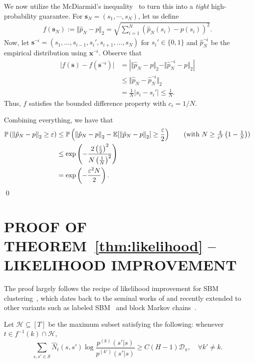 \documentclass[twoside]{article}
\def\vs{{\bm{s}}}
\def\vx{{\bm{x}}}
\def\gD{{\mathcal{D}}}
\def\gH{{\mathcal{H}}}
\def\gS{{\mathcal{S}}}
\def\sP{{\mathbb{P}}}
\newcommand{\E}{\mathbb{E}}
\theoremstyle{plain}
\def\bignorm#1{\left\lVert #1 \right\rVert}
\begin{document}
We now utilize the McDiarmid's inequality~\citep{mcdiarmid} to turn this into a \textit{tight} high-probability guarantee.
For $\vs_N = (s_1, \cdots, s_N)$, let us define
\begin{align*}
	f(\vs_N) := \Vert \hat{p}_N - p \Vert_2 = \sqrt{\sum_{i=1}^N (\hat{p}_N(s_i) - p(s_i))^2}.
\end{align*}
Now, let $\vs^{\neg i} = (s_1, \dots, s_{i-1}, s_i', s_{i+1}, \dots, s_N)$ for $s_i' \in \{0, 1\}$ and $\hat{p}_N^{\neg i}$ be the empirical distribution using $\vx^{\neg i}$.
Observe that 
\begin{align*}
	\vert f(\vs) - f(\vs^{\neg i}) \vert &= \left\vert  \Vert \hat{p}_N - p \Vert_2 - \Vert \hat{p}_N^{\neg i} - p \Vert_2 \right\vert \\
	&\le 
	\Vert \hat{p}_N - \hat{p}_N^{\neg i}  \Vert_2  \tag{Triangle inequality}   \\
	&= \frac{1}{N} |s_i - s_i'|
	\leq \frac{1}{N}.
\end{align*}
Thus, $f$ satisfies the bounded difference property with $c_i = 1 / N$.

Combining everything, we have that
\begin{align*}
	\sP\left( \bignorm{\hat{p}_N - p}_2 \geq \varepsilon \right) &\leq \sP\left( \bignorm{\hat{p}_N - p}_2 - \E[\bignorm{\hat{p}_N - p}_2] \geq \frac{\varepsilon}{2} \right) \tag{with $N \geq \frac{4}{\varepsilon^2}\left(1 - \frac{1}{S} \right)$} \\
	&\leq \exp\left( - \frac{2 \left(\frac{ \varepsilon}{2} \right)^2}{N \left(\frac{1}{N} \right)^2} \right) \\
	&= \exp\left( - \frac{\varepsilon^2 N}{2} \right).
\end{align*}
\qed


\clearpage

\section{\texorpdfstring{PROOF OF THEOREM~\ref{thm:likelihood} -- LIKELIHOOD IMPROVEMENT}{PROOF OF THEOREM 4.2 -- LIKELIHOOD IMPROVEMENT}}
\label{app:likelihood}
The proof largely follows the recipe of likelihood improvement for SBM clustering~\citep{yun2014spectral,yun2014adaptive}, which dates back to the seminal works of \citet{abbe2018sbm,amini2013sbm} and recently extended to other variants such as labeled SBM~\citep{yun2016labeled} and block Markov chains~\citep{jedra2023bmdp,sanders2020bmc}.

Let $\gH \subseteq [T]$ be the maximum subset satisfying the following:
whenever $t \in f^{-1}(k) \cap \gH$,
\begin{equation}
    \sum_{s, s' \in \gS} \widehat{N}_t(s, s') \log \frac{p^{(k)}(s' | s)}{p^{(k')}(s' | s)} \geq C (H - 1) \gD_\pi, \quad \forall k' \neq k.
\end{equation}
\end{document}
